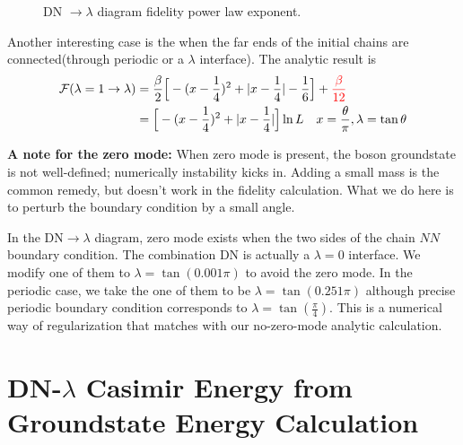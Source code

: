 \documentclass{article}
\begin{document}
\begin{figure}[!h]
\begin{minipage}[t]{0.65\linewidth}
\caption{DN $\rightarrow \lambda$ diagram fidelity power law exponent.}
\end{minipage}
\end{figure}

Another interesting case is the when the far ends of the initial chains are connected(through periodic or a $\lambda$ interface). The analytic result is
\begin{equation}
\begin{aligned}
  \mathcal{F}( \lambda = 1 \rightarrow \lambda ) &=  \frac{\beta}{2}\Big[  -( x - \frac{1}{4} )^2  + | x - \frac{1}{4} | - \frac{1}{6} \Big]  + {\color{red} \frac{\beta}{12}} \\
  &= \Big[  -( x - \frac{1}{4} )^2  + | x - \frac{1}{4} | \Big]  \ln L \quad x = \frac{\theta}{\pi}, \lambda = \tan \theta 
\end{aligned}
\end{equation}

{\bf A note for the zero mode:} When zero mode is present, the boson groundstate is not well-defined; numerically instability kicks in. Adding a small mass is the common remedy, but doesn't work in the fidelity calculation. What we do here is to perturb the boundary condition by a small angle.

In the DN$\rightarrow \lambda$ diagram, zero mode exists when the two sides of the chain $NN$ boundary condition. The combination DN is actually a $\lambda = 0$ interface. We modify one of them to $\lambda = \tan( 0.001 \pi )$ to avoid the zero mode. In the periodic case, we take the one of them to be $\lambda = \tan(0.251\pi)$ although precise periodic boundary condition corresponds to $\lambda = \tan(\frac{\pi}{4})$. This is a numerical way of regularization that matches with our no-zero-mode analytic calculation. 




\appendix


\section{DN-$\lambda$ Casimir Energy from Groundstate Energy Calculation}
\label{app:gnd_dn_lambda}
\end{document}
